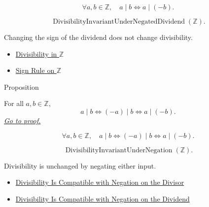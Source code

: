 \begin{remark*}
\[
\forall a,b\in\mathbb{Z},\quad
a\mid b \Longleftrightarrow a\mid(-b).
\]
\end{remark*}

\begin{remark*}
\[
\operatorname{DivisibilityInvariantUnderNegatedDividend}(\mathbb{Z}).
\]
\end{remark*}

\begin{remark*}[Interpretation]
Changing the sign of the dividend does not change divisibility.
\end{remark*}

\begin{dependencies}
\begin{itemize}
  \item \hyperref[def:divisibility-in-z]{Divisibility in $\mathbb{Z}$}
  \item \hyperref[cor:sign-rule-on-z]{Sign Rule on $\mathbb{Z}$}
\end{itemize}
\end{dependencies}

\begin{propositionbox}{Proposition}
\begin{proposition}
\label{prop:divisibility-compatible-with-negation-on-z}
For all $a,b\in\mathbb{Z}$,
\[
a\mid b \Longleftrightarrow (-a)\mid b \Longleftrightarrow a\mid(-b).
\]
\hyperref[prf:divisibility-compatible-with-negation-on-z]{\textit{Go to proof.}}
\end{proposition}
\end{propositionbox}

\begin{remark*}
\[
\forall a,b\in\mathbb{Z},\quad
a\mid b \Longleftrightarrow (-a)\mid b \Longleftrightarrow a\mid(-b).
\]
\end{remark*}

\begin{remark*}
\[
\operatorname{DivisibilityInvariantUnderNegation}(\mathbb{Z}).
\]
\end{remark*}

\begin{remark*}[Interpretation]
Divisibility is unchanged by negating either input.
\end{remark*}

\begin{dependencies}
\begin{itemize}
  \item \hyperref[prop:divisibility-compatible-with-negation-divisor-on-z]{Divisibility Is Compatible with Negation on the Divisor}
  \item \hyperref[prop:divisibility-compatible-with-negation-dividend-on-z]{Divisibility Is Compatible with Negation on the Dividend}
\end{itemize}
\end{dependencies}

